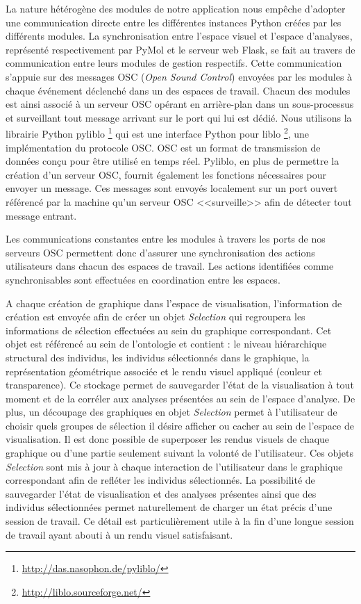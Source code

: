 La nature hétérogène des modules de notre application nous empêche d'adopter une communication directe entre les différentes instances Python créées par les différents modules. La synchronisation entre l'espace visuel et l'espace d'analyses, représenté respectivement par PyMol et le serveur web Flask, se fait au travers de communication entre leurs modules de gestion respectifs. Cette communication s'appuie sur des messages OSC (\textit{Open Sound Control}) envoyées par les modules à chaque événement déclenché dans un des espaces de travail. Chacun des modules est ainsi associé à un serveur OSC opérant en arrière-plan dans un sous-processus et surveillant tout message arrivant sur le port qui lui est dédié. Nous utilisons la librairie Python pyliblo \footnote{\url{http://das.nasophon.de/pyliblo/}} qui est une interface Python pour liblo \footnote{\url{http://liblo.sourceforge.net/}}, une implémentation du protocole OSC. OSC est un format de transmission de données conçu pour être utilisé en temps réel. Pyliblo, en plus de permettre la création d'un serveur OSC, fournit également les fonctions nécessaires pour envoyer un message. Ces messages sont envoyés localement sur un port ouvert référencé par la machine qu'un serveur OSC <<surveille>> afin de détecter tout message entrant.

Les communications constantes entre les modules à travers les ports de nos serveurs OSC permettent donc d'assurer une synchronisation des actions utilisateurs dans chacun des espaces de travail. Les actions identifiées comme synchronisables sont effectuées en coordination entre les espaces.

A chaque création de graphique dans l'espace de visualisation, l'information de création est envoyée afin de créer un objet \textit{Selection} qui regroupera les informations de sélection effectuées au sein du graphique correspondant. Cet objet est référencé au sein de l'ontologie et contient : le niveau hiérarchique structural des individus, les individus sélectionnés dans le graphique, la représentation géométrique associée et le rendu visuel appliqué (couleur et transparence). Ce stockage permet de sauvegarder l'état de la visualisation à tout moment et de la corréler aux analyses présentées au sein de l'espace d'analyse. De plus, un découpage des graphiques en objet \textit{Selection} permet à l'utilisateur de choisir quels groupes de sélection il désire afficher ou cacher au sein de l'espace de visualisation. Il est donc possible de superposer les rendus visuels de chaque graphique ou d'une partie seulement suivant la volonté de l'utilisateur. Ces objets \textit{Selection} sont mis à jour à chaque interaction de l'utilisateur dans le graphique correspondant afin de refléter les individus sélectionnés. La possibilité de sauvegarder l'état de visualisation et des analyses présentes ainsi que des individus sélectionnées permet naturellement de charger un état précis d'une session de travail. Ce détail est particulièrement utile à la fin d'une longue session de travail ayant abouti à un rendu visuel satisfaisant.


